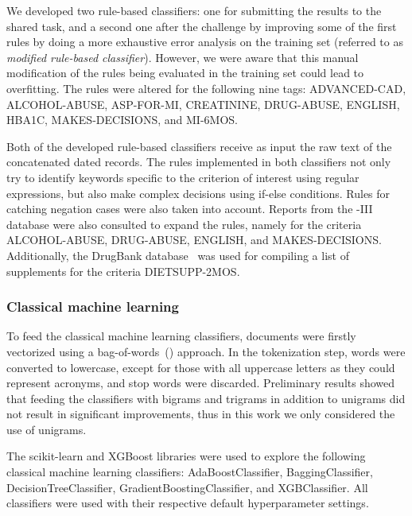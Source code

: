 We developed two rule-based classifiers: one for submitting the results to the  shared task, and a second one after the challenge by improving some of the first rules by doing a more exhaustive error analysis on the training set (referred to as \textit{modified rule-based classifier}).
However, we were aware that this manual modification of the rules being evaluated in the training set could lead to overfitting.
The rules were altered for the following nine tags: \textsf{ADVANCED-CAD}, \textsf{ALCOHOL-ABUSE}, \textsf{ASP-FOR-MI}, \textsf{CREATININE}, \textsf{DRUG-ABUSE}, \textsf{ENGLISH}, \textsf{HBA1C}, \textsf{MAKES-DECISIONS}, and \textsf{MI-6MOS}.

Both of the developed rule-based classifiers receive as input the raw text of the concatenated dated records.
The rules implemented in both classifiers not only try to identify keywords specific to the criterion of interest using regular expressions, but also make complex decisions using if-else conditions.
Rules for catching negation cases were also taken into account.
Reports from the -III database were also consulted to expand the rules, namely for the criteria \textsf{ALCOHOL-ABUSE}, \textsf{DRUG-ABUSE}, \textsf{ENGLISH}, and \textsf{MAKES-DECISIONS}.
Additionally, the DrugBank database~\parencite{wishart2018a} was used for compiling a list of supplements for the criteria \textsf{DIETSUPP-2MOS}.


\subsubsection{Classical machine learning}

To feed the classical machine learning classifiers, documents were firstly vectorized using a bag-of-words~() approach.
In the tokenization step, words were converted to lowercase, except for those with all uppercase letters as they could represent acronyms, and stop words were discarded.
Preliminary results showed that feeding the classifiers with bigrams and trigrams in addition to unigrams did not result in significant improvements, thus in this work we only considered the use of unigrams.

The scikit-learn and XGBoost libraries were used to explore the following classical machine learning classifiers: \textsf{AdaBoostClassifier}, \textsf{BaggingClassifier}, \textsf{DecisionTreeClassifier}, \textsf{GradientBoostingClassifier}, and \textsf{XGBClassifier}.
All classifiers were used with their respective default hyperparameter settings.

